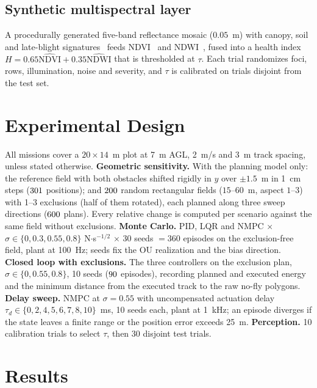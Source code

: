 \documentclass[\PAPERCLASSOPT]{IEEEtran}
\begin{document}
\subsection{Synthetic multispectral layer}

A procedurally generated five-band reflectance mosaic ($0.05$~m) with canopy,
soil and late-blight signatures~\cite{franceschini2019lateblight} feeds
NDVI~\cite{rouse1974ndvi} and NDWI~\cite{gao1996ndwi}, fused into a health index
$H=0.65\widehat{\mathrm{NDVI}}+0.35\widehat{\mathrm{NDWI}}$ that is thresholded
at $\tau$. Each trial randomizes foci, rows, illumination, noise and severity,
and $\tau$ is calibrated on trials disjoint from the test set.

\section{Experimental Design}

All missions cover a $20\times14$~m plot at 7~m AGL, 2~m/s and 3~m track
spacing, unless stated otherwise.
\textbf{Geometric sensitivity.} With the planning model only: the reference field
with both obstacles shifted rigidly in $y$ over $\pm1.5$~m in 1~cm steps
($301$ positions); and $200$ random rectangular fields
($15$--$60$~m, aspect $1$--$3$) with 1--3 exclusions (half of them rotated),
each planned along three sweep directions ($600$ plans). Every relative change
is computed per scenario against the same field without exclusions.
\textbf{Monte Carlo.} PID, LQR and NMPC $\times$ $\sigma\in\{0,0.3,0.55,0.8\}$
N$\cdot$s$^{-1/2}$ $\times$ 30 seeds $=360$ episodes on the exclusion-free field,
plant at 100~Hz; seeds fix the OU realization and the bias direction.
\textbf{Closed loop with exclusions.} The three controllers on the
exclusion plan, $\sigma\in\{0,0.55,0.8\}$, 10 seeds ($90$ episodes),
recording planned and executed energy and the minimum distance from the executed
track to the raw no-fly polygons.
\textbf{Delay sweep.} NMPC at $\sigma=0.55$ with uncompensated actuation delay
$\tau_d\in\{0,2,4,5,6,7,8,10\}$~ms, 10 seeds each, plant at 1~kHz; an episode
diverges if the state leaves a finite range or the position error exceeds 25~m.
\textbf{Perception.} 10 calibration trials to select $\tau$, then 30 disjoint
test trials.

\section{Results}
\end{document}
